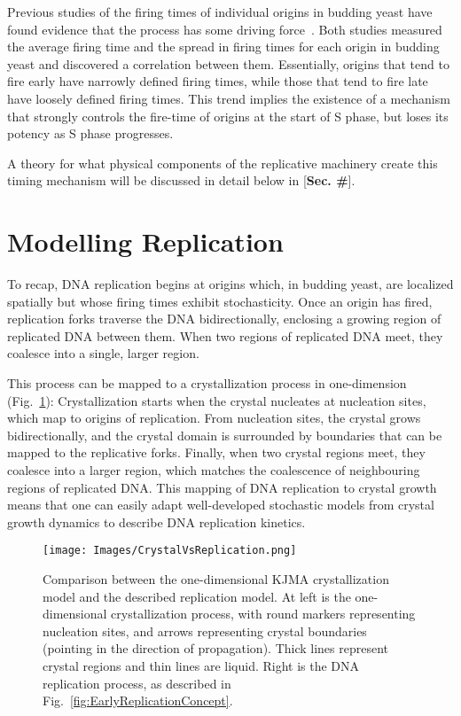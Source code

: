 		Previous studies of the firing times of individual origins in budding yeast have found evidence that the process has some driving force~\cite{ScottsPaper,StochasticTermination}.
		Both studies measured the average firing time and the spread in firing times for each origin in budding yeast and discovered a correlation between them.
		Essentially, origins that tend to fire early have narrowly defined firing times, while those that tend to fire late have loosely defined firing times.
		This trend implies the existence of a mechanism that strongly controls the fire-time of origins at the start of S phase, but loses its potency as S phase progresses.
		
		A theory for what physical components of the replicative machinery create this timing mechanism will be discussed in detail below in  [\textbf{Sec. \#}].
		
		
	\section{Modelling Replication}
	\label{sec:Modelling}
	
	To recap, DNA replication begins at origins which, in budding yeast, are localized spatially but whose firing times exhibit stochasticity.
	Once an origin has fired, replication forks traverse the DNA bidirectionally, enclosing a growing region of replicated DNA between them.
	When two regions of replicated DNA meet, they coalesce into a single, larger region.
	
	This process can be mapped to a crystallization process in one-dimension (Fig.~\ref{fig:CrystalVsReplication}):
	Crystallization starts when the crystal nucleates at nucleation sites, which map to origins of replication.
	From nucleation sites, the crystal grows bidirectionally, and the crystal domain is surrounded by boundaries that can be mapped to the replicative forks.
	Finally, when two crystal regions meet, they coalesce into a larger region, which matches the coalescence of neighbouring regions of replicated DNA.
	This mapping of DNA replication to crystal growth means that one can easily adapt well-developed stochastic models from crystal growth dynamics to describe DNA replication kinetics.
	
	\begin{figure}[tbh]
		\begin{center}
			\texttt{[image: Images/CrystalVsReplication.png]}
		\end{center}
			\caption[Comparing Crystallization with Replication]{\label{fig:CrystalVsReplication} Comparison between the one-dimensional KJMA crystallization model and the described replication model.
				At left is the one-dimensional crystallization process, with round markers representing nucleation sites, and arrows representing crystal boundaries (pointing in the direction of propagation).
				Thick lines represent crystal regions and thin lines are liquid.
				Right is the DNA replication process, as described in Fig.~\ref{fig:EarlyReplicationConcept}.}
	\end{figure}
	
